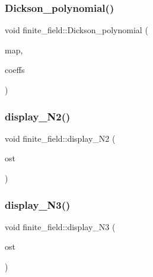 \subsubsection{\texorpdfstring{Dickson\+\_\+polynomial()}{Dickson\_polynomial()}}
{\footnotesize\ttfamily void finite\+\_\+field\+::\+Dickson\+\_\+polynomial (\begin{DoxyParamCaption}\item[{\mbox{\hyperlink{galois_8h_a09fddde158a3a20bd2dcadb609de11dc}{I\+NT}} $\ast$}]{map,  }\item[{\mbox{\hyperlink{galois_8h_a09fddde158a3a20bd2dcadb609de11dc}{I\+NT}} $\ast$}]{coeffs }\end{DoxyParamCaption})}

\mbox{\label{classfinite__field_ad66c70d4957af58f1ba0652bc8ece5f0}} 
\subsubsection{\texorpdfstring{display\+\_\+\+N2()}{display\_N2()}}
{\footnotesize\ttfamily void finite\+\_\+field\+::display\+\_\+\+N2 (\begin{DoxyParamCaption}\item[{ostream \&}]{ost }\end{DoxyParamCaption})}

\mbox{\label{classfinite__field_a4fe5992dc30abce53c6a86d6e3a666a8}} 
\subsubsection{\texorpdfstring{display\+\_\+\+N3()}{display\_N3()}}
{\footnotesize\ttfamily void finite\+\_\+field\+::display\+\_\+\+N3 (\begin{DoxyParamCaption}\item[{ostream \&}]{ost }\end{DoxyParamCaption})}

\mbox{\label{classfinite__field_a73592a477a519c7823666db81c18a5a9}} 
